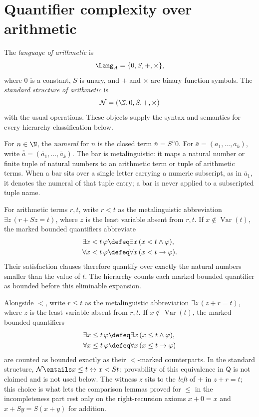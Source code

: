 \section{Quantifier complexity over arithmetic}
\label{sec:decision-hierarchy-02}

\begin{definition}
\label{def:language-arithmetic}
The \emph{language of arithmetic} is
\[
  \Lang_A=\{0,S,+,\times\},
\]
where \(0\) is a constant, \(S\) is unary, and \(+\) and \(\times\) are
binary function symbols.  The \emph{standard structure of arithmetic} is
\[
  \mathcal N=(\N,0,S,+,\times)
\]
with the usual operations.  These objects supply the syntax and semantics for
every hierarchy classification below.
\end{definition}

For \(n\in\N\), the \emph{numeral} for \(n\) is the closed term
\(\bar n=S^n0\).  For \(\bar a=(a_1,\ldots,a_k)\), write
\(\overline{\bar a}=(\bar a_1,\ldots,\bar a_k)\).  The bar is
metalinguistic: it maps a natural number or finite tuple of natural numbers to
an arithmetic term or tuple of arithmetic terms.  When a bar sits over a
single letter carrying a numeric subscript, as in \(\bar a_1\), it denotes
the numeral of that tuple entry; a bar is never applied to a subscripted
tuple name.

For arithmetic terms \(r,t\), write
\(r<t\) as the metalinguistic abbreviation
\(\exists z\,(r+Sz=t)\), where \(z\) is the least variable absent from
\(r,t\).  If \(x\notin\operatorname{Var}(t)\), the marked bounded quantifiers
abbreviate
\[
\begin{aligned}
  \exists x<t\,\varphi &\defeq \exists x\,(x<t\land\varphi),\\
  \forall x<t\,\varphi &\defeq \forall x\,(x<t\to\varphi).
\end{aligned}
\]
Their satisfaction clauses therefore quantify over exactly the natural
numbers smaller than the value of \(t\).  The hierarchy counts each marked
bounded quantifier as bounded before this eliminable expansion.

Alongside \(<\), write \(r\leq t\) as the metalinguistic abbreviation
\(\exists z\,(z+r=t)\), where \(z\) is the least variable absent from
\(r,t\).  If \(x\notin\operatorname{Var}(t)\), the marked bounded
quantifiers
\[
\begin{aligned}
  \exists x\leq t\,\varphi &\defeq \exists x\,(x\leq t\land\varphi),\\
  \forall x\leq t\,\varphi &\defeq \forall x\,(x\leq t\to\varphi)
\end{aligned}
\]
are counted as bounded exactly as their \(<\)-marked counterparts.  In the
standard structure, \(\mathcal N\entails x\leq t\leftrightarrow x<St\);
provability of this equivalence in \(\mathsf Q\) is not claimed and is not
used below.  The witness \(z\) sits to the \emph{left} of \(+\) in
\(z+r=t\); this choice is what lets the comparison lemmas proved for
\(\leq\) in the incompleteness part rest only on the right-recursion
axioms \(x+0=x\) and \(x+Sy=S(x+y)\) for addition.

